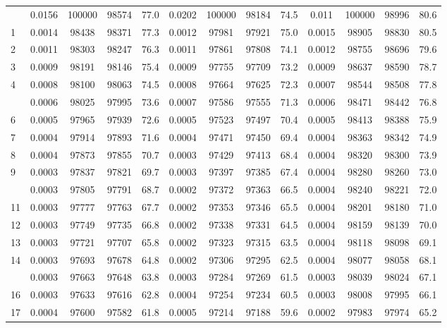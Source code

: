 \documentclass[
  14pt,
]{article}
\begin{document}
\begin{longtable}[t]{lcccccccccccc}
\endfoot
\bottomrule
\endlastfoot
0 & 0.0156 & 100000 & 98574 & 77.0 & 0.0202 & 100000 & 98184 & 74.5 & 0.011 & 100000 & 98996 & 80.6\\
1 & 0.0014 & 98438 & 98371 & 77.3 & 0.0012 & 97981 & 97921 & 75.0 & 0.0015 & 98905 & 98830 & 80.5\\
2 & 0.0011 & 98303 & 98247 & 76.3 & 0.0011 & 97861 & 97808 & 74.1 & 0.0012 & 98755 & 98696 & 79.6\\
3 & 0.0009 & 98191 & 98146 & 75.4 & 0.0009 & 97755 & 97709 & 73.2 & 0.0009 & 98637 & 98590 & 78.7\\
4 & 0.0008 & 98100 & 98063 & 74.5 & 0.0008 & 97664 & 97625 & 72.3 & 0.0007 & 98544 & 98508 & 77.8\\
\addlinespace
5 & 0.0006 & 98025 & 97995 & 73.6 & 0.0007 & 97586 & 97555 & 71.3 & 0.0006 & 98471 & 98442 & 76.8\\
6 & 0.0005 & 97965 & 97939 & 72.6 & 0.0005 & 97523 & 97497 & 70.4 & 0.0005 & 98413 & 98388 & 75.9\\
7 & 0.0004 & 97914 & 97893 & 71.6 & 0.0004 & 97471 & 97450 & 69.4 & 0.0004 & 98363 & 98342 & 74.9\\
8 & 0.0004 & 97873 & 97855 & 70.7 & 0.0003 & 97429 & 97413 & 68.4 & 0.0004 & 98320 & 98300 & 73.9\\
9 & 0.0003 & 97837 & 97821 & 69.7 & 0.0003 & 97397 & 97385 & 67.4 & 0.0004 & 98280 & 98260 & 73.0\\
\addlinespace
10 & 0.0003 & 97805 & 97791 & 68.7 & 0.0002 & 97372 & 97363 & 66.5 & 0.0004 & 98240 & 98221 & 72.0\\
11 & 0.0003 & 97777 & 97763 & 67.7 & 0.0002 & 97353 & 97346 & 65.5 & 0.0004 & 98201 & 98180 & 71.0\\
12 & 0.0003 & 97749 & 97735 & 66.8 & 0.0002 & 97338 & 97331 & 64.5 & 0.0004 & 98159 & 98139 & 70.0\\
13 & 0.0003 & 97721 & 97707 & 65.8 & 0.0002 & 97323 & 97315 & 63.5 & 0.0004 & 98118 & 98098 & 69.1\\
14 & 0.0003 & 97693 & 97678 & 64.8 & 0.0002 & 97306 & 97295 & 62.5 & 0.0004 & 98077 & 98058 & 68.1\\
\addlinespace
15 & 0.0003 & 97663 & 97648 & 63.8 & 0.0003 & 97284 & 97269 & 61.5 & 0.0003 & 98039 & 98024 & 67.1\\
16 & 0.0003 & 97633 & 97616 & 62.8 & 0.0004 & 97254 & 97234 & 60.5 & 0.0003 & 98008 & 97995 & 66.1\\
17 & 0.0004 & 97600 & 97582 & 61.8 & 0.0005 & 97214 & 97188 & 59.6 & 0.0002 & 97983 & 97974 & 65.2\\

\end{longtable}
\end{document}
